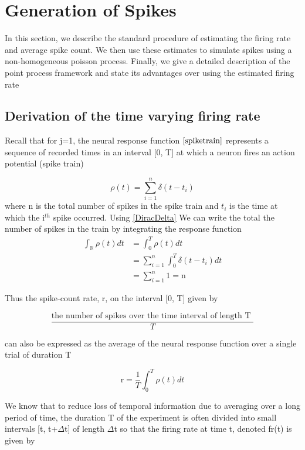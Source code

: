 
\section{Generation of Spikes}
In this section, we describe the standard procedure of estimating the 
firing rate and average spike count. We then use these estimates
to simulate spikes using a non-homogeneous poisson process.
Finally, we give a detailed description of the point process framework and 
state its advantages over using the estimated firing rate

\subsection{Derivation of the time varying firing rate}
Recall that for j=1, the neural response function $\eqref{spiketrain}$ represents a sequence of recorded times in an interval [0, T] at which a neuron fires an action potential (spike train)

\begin{equation}\label{response function}
 \rho(t) = \sum_{i=1}^{n} \delta(t-t_{i})  
\end{equation}
where n is the total number of spikes in the spike train and $t_{i}$ is the time at which the i$^{th}$ spike occurred. Using \eqref{DiracDelta}
We can write the total the number of spikes in the train by integrating the response function
\begin{align*}
\int_{\mathbb{R}}  \rho(t)  dt &=   \int_{0}^{T}  \rho(t)  dt\\
      &= \displaystyle  \sum_{i=1}^{n}    \int_{0}^{T}  \delta(t-t_{i}) dt\\
              & = \displaystyle  \sum_{i=1}^{n} 1 = \text{n}
\end{align*}


Thus the spike-count rate, r,  on the interval [0, T]  given by

\[ \dfrac{\text{the number of spikes over the time interval of length T }}{T} \]

can also be expressed as the average of the neural response function
over a single trial of duration T

\begin{equation}\label{spike-count rate}
  \text{r} =  \frac{1}{T}  \int_{0}^{T}  \rho(t)  dt
\end{equation}

We know that to reduce loss of temporal information due to averaging over a long period of time, the duration T of the experiment is often divided into small intervals [t, t+$\Delta$t] of length $\Delta$t so that the firing rate at time t,
denoted fr(t)  is  given by

